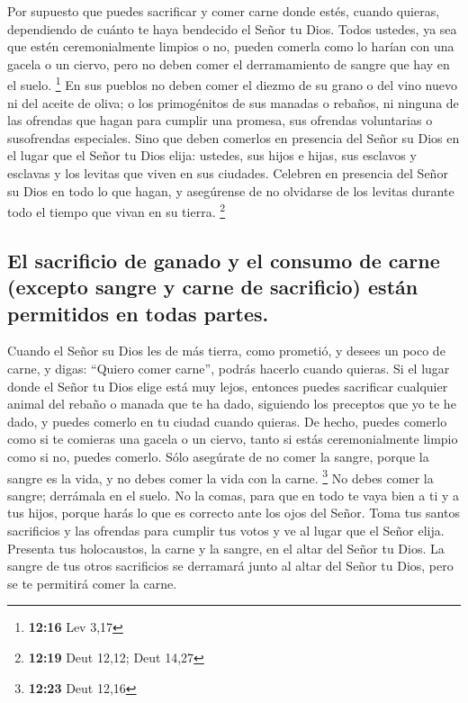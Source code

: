  Por supuesto que puedes sacrificar y comer carne donde
estés, cuando quieras, dependiendo de cuánto te haya bendecido el Señor
tu Dios. Todos ustedes, ya sea que estén ceremonialmente limpios o no,
pueden comerla como lo harían con una gacela o un ciervo,
 pero no deben comer el derramamiento de sangre que hay
en el suelo. \footnote{\textbf{12:16} Lev 3,17}  En sus
pueblos no deben comer el diezmo de su grano o del vino nuevo ni del
aceite de oliva; o los primogénitos de sus manadas o rebaños, ni ninguna
de las ofrendas que hagan para cumplir una promesa, sus ofrendas
voluntarias o susofrendas especiales.  Sino que deben
comerlos en presencia del Señor su Dios en el lugar que el Señor tu Dios
elija: ustedes, sus hijos e hijas, sus esclavos y esclavas y los levitas
que viven en sus ciudades. Celebren en presencia del Señor su Dios en
todo lo que hagan,  y asegúrense de no olvidarse de los
levitas durante todo el tiempo que vivan en su tierra. \footnote{\textbf{12:19}
  Deut 12,12; Deut 14,27}

\hypertarget{el-sacrificio-de-ganado-y-el-consumo-de-carne-excepto-sangre-y-carne-de-sacrificio-estuxe1n-permitidos-en-todas-partes.}{%
\subsection{El sacrificio de ganado y el consumo de carne (excepto
sangre y carne de sacrificio) están permitidos en todas
partes.}\label{el-sacrificio-de-ganado-y-el-consumo-de-carne-excepto-sangre-y-carne-de-sacrificio-estuxe1n-permitidos-en-todas-partes.}}

 Cuando el Señor su Dios les de más tierra, como
prometió, y desees un poco de carne, y digas: ``Quiero comer carne'',
podrás hacerlo cuando quieras.  Si el lugar donde el
Señor tu Dios elige está muy lejos, entonces puedes sacrificar cualquier
animal del rebaño o manada que te ha dado, siguiendo los preceptos que
yo te he dado, y puedes comerlo en tu ciudad cuando quieras.
 De hecho, puedes comerlo como si te comieras una gacela
o un ciervo, tanto si estás ceremonialmente limpio como si no, puedes
comerlo.  Sólo asegúrate de no comer la sangre, porque la
sangre es la vida, y no debes comer la vida con la carne. \footnote{\textbf{12:23}
  Deut 12,16}  No debes comer la sangre; derrámala en el
suelo.  No la comas, para que en todo te vaya bien a ti y
a tus hijos, porque harás lo que es correcto ante los ojos del Señor.
 Toma tus santos sacrificios y las ofrendas para cumplir
tus votos y ve al lugar que el Señor elija.  Presenta tus
holocaustos, la carne y la sangre, en el altar del Señor tu Dios. La
sangre de tus otros sacrificios se derramará junto al altar del Señor tu
Dios, pero se te permitirá comer la carne.

